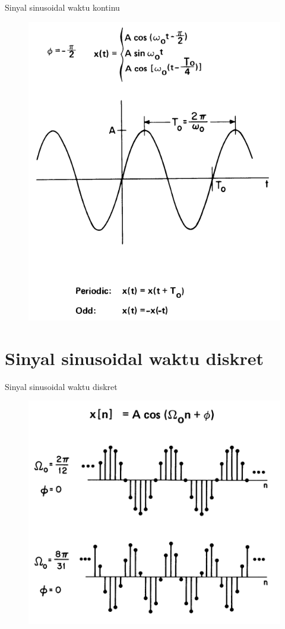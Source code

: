 \documentclass[pdflatex,compress,mathserif]{beamer}
\begin{document}
\begin{frame}{Sinyal sinusoidal waktu kontinu}
	\begin{figure}
		\centering
		\includegraphics[height=0.8\textheight]{img/01.slide_04}
	\end{figure}
\end{frame}

\section{Sinyal sinusoidal waktu diskret}
\begin{frame}{Sinyal sinusoidal waktu diskret}
	\begin{figure}
		\centering
		\includegraphics[height=0.8\textheight]{img/01.slide_05}
	\end{figure}
\end{frame}
\end{document}
